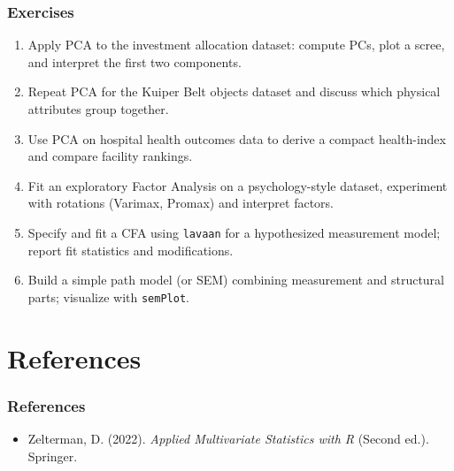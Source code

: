 \documentclass{beamer}
\newcommand{\code}[1]{\texttt{#1}}
\begin{document}
\begin{frame}
    \frametitle{Exercises}
    \begin{enumerate}
        \item Apply PCA to the investment allocation dataset: compute PCs, plot a scree, and interpret the first two components.
        \item Repeat PCA for the Kuiper Belt objects dataset and discuss which physical attributes group together.
        \item Use PCA on hospital health outcomes data to derive a compact health-index and compare facility rankings.
        \item Fit an exploratory Factor Analysis on a psychology-style dataset, experiment with rotations (Varimax, Promax) and interpret factors.
        \item Specify and fit a CFA using \code{lavaan} for a hypothesized measurement model; report fit statistics and modifications.
        \item Build a simple path model (or SEM) combining measurement and structural parts; visualize with \code{semPlot}.
    \end{enumerate}
\end{frame}

\section*{References}
\begin{frame}
    \frametitle{References}
    \begin{itemize}
        \item Zelterman, D. (2022). \textit{Applied Multivariate Statistics with R} (Second ed.). Springer.
    \end{itemize}
\end{frame}
\end{document}
